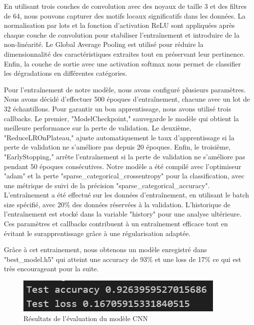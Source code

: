 \newpage
 En utilisant trois couches de convolution avec des noyaux de taille 3 et des filtres de 64, nous pouvons capturer des motifs locaux significatifs dans les données. La normalisation par lots et la fonction d'activation ReLU sont appliquées après chaque couche de convolution pour stabiliser l'entraînement et introduire de la non-linéarité. Le Global Average Pooling est utilisé pour réduire la dimensionnalité des caractéristiques extraites tout en préservant leur pertinence. Enfin, la couche de sortie avec une activation softmax nous permet de classifier les dégradations en différentes catégories. 

Pour l'entraînement de notre modèle, nous avons configuré plusieurs paramètres. Nous avons décidé d'effectuer 500 époques d'entraînement, chacune avec un lot de 32 échantillons. Pour garantir un bon apprentissage, nous avons utilisé trois callbacks. Le premier, "ModelCheckpoint," sauvegarde le modèle qui obtient la meilleure performance sur la perte de validation. Le deuxième, "ReduceLROnPlateau," ajuste automatiquement le taux d'apprentissage si la perte de validation ne s'améliore pas depuis 20 époques. Enfin, le troisième, "EarlyStopping," arrête l'entraînement si la perte de validation ne s'améliore pas pendant 50 époques consécutives. Notre modèle a été compilé avec l'optimiseur "adam" et la perte "sparse\_categorical\_crossentropy" pour la classification, avec une métrique de suivi de la précision "sparse\_categorical\_accuracy". L'entraînement a été effectué sur les données d'entraînement, en utilisant le batch size spécifié, avec 20\% des données réservées à la validation. L'historique de l'entraînement est stocké dans la variable "history" pour une analyse ultérieure. Ces paramètres et callbacks contribuent à un entraînement efficace tout en évitant le surapprentissage grâce à une régularisation adaptée.

Grâce à cet entrainement, nous obtenons un modèle enregistré dans "best\_model.h5" qui atteint une accuracy de 93\% et une loss de 17\% ce qui est très encourageant pour la suite.
\begin{figure}[H]
    \centering
    \includegraphics[width=0.5\linewidth]{test.png}
    \caption{Résultats de l'évaluation du modèle CNN}
    \label{resultat_cnn}
\end{figure}

